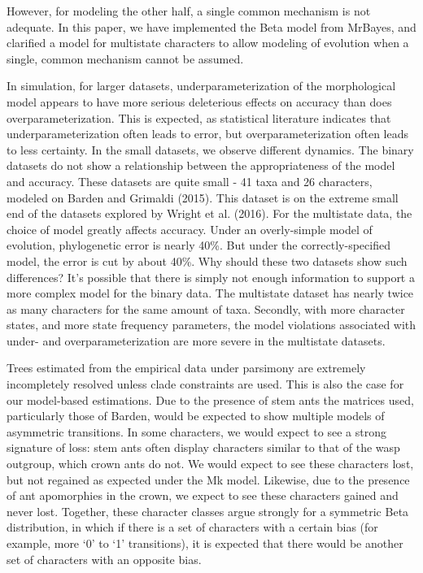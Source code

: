 \documentclass[]{sysbio}
\begin{document}
However, for modeling the other half, a single common mechanism is not adequate. 
In this paper, we have implemented the Beta model from MrBayes, and clarified a model for multistate characters to allow modeling of evolution when a single, common mechanism cannot be assumed. \par
In simulation, for larger datasets, underparameterization of the morphological model appears to have more serious deleterious effects on accuracy than does overparameterization.
This is expected, as statistical literature indicates that underparameterization often leads to error, but overparameterization often leads to less certainty.
In the small datasets, we observe different dynamics. 
The binary datasets do not show a relationship between the appropriateness of the model and accuracy.
These datasets are quite small - 41 taxa and 26 characters, modeled on Barden and Grimaldi (2015). 
This dataset is on the extreme small end of the datasets explored by Wright et al. (2016). 
For the multistate data, the choice of model greatly affects accuracy. 
Under an overly-simple model of evolution, phylogenetic error is nearly 40\%. 
But under the correctly-specified model, the error is cut by about 40\%. 
Why should these two datasets show such differences? 
It's possible that there is simply not enough information to support a more complex model for the binary data.
The multistate dataset has nearly twice as many characters for the same amount of taxa. 
Secondly, with more character states, and more state frequency parameters, the model violations associated with under- and overparameterization are more severe in the multistate datasets.
\par
Trees estimated from the empirical data under parsimony are extremely incompletely resolved unless clade constraints are used.
This is also the case for our model-based estimations. 
Due to the presence of stem ants the matrices used, particularly those of Barden, would be expected to show multiple models of asymmetric transitions. 
In some characters, we would expect to see a strong signature of loss: stem ants often display characters similar to that of the wasp outgroup, which crown ants do not.
We would expect to see these characters lost, but not regained as expected under the Mk model.
Likewise, due to the presence of ant apomorphies in the crown, we expect to see these characters gained and never lost.
Together, these character classes argue strongly for a symmetric Beta distribution, in which if there is a set of characters with a certain bias (for example, more `0' to `1' transitions), it is expected that there would be another set of characters with an opposite bias. \par
\end{document}
